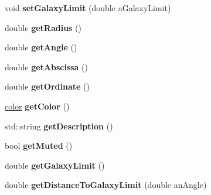 \begin{DoxyCompactItemize}
\item 
\hypertarget{class_star_a3b8c8edca0eb3ccc89a4b91227bc7d97}{void {\bfseries set\-Galaxy\-Limit} (double a\-Galaxy\-Limit)}\label{class_star_a3b8c8edca0eb3ccc89a4b91227bc7d97}

\item 
\hypertarget{class_star_a8791cc2c8764f7213379dccc47cb6327}{double {\bfseries get\-Radius} ()}\label{class_star_a8791cc2c8764f7213379dccc47cb6327}

\item 
\hypertarget{class_star_a8ccf772d6c9cbfae316d5826cbd9a005}{double {\bfseries get\-Angle} ()}\label{class_star_a8ccf772d6c9cbfae316d5826cbd9a005}

\item 
\hypertarget{class_star_a15a3dc0db429e55c800c5b223188d621}{double {\bfseries get\-Abscissa} ()}\label{class_star_a15a3dc0db429e55c800c5b223188d621}

\item 
\hypertarget{class_star_aeff266b94f5f11a0284936c7463504cc}{double {\bfseries get\-Ordinate} ()}\label{class_star_aeff266b94f5f11a0284936c7463504cc}

\item 
\hypertarget{class_star_ab3b191c54d8d42677845d2e5216bc3dd}{\hyperlink{structcolor}{color} {\bfseries get\-Color} ()}\label{class_star_ab3b191c54d8d42677845d2e5216bc3dd}

\item 
\hypertarget{class_star_aa87c110acd935d65ab862d0bd3ee662a}{std\-::string {\bfseries get\-Description} ()}\label{class_star_aa87c110acd935d65ab862d0bd3ee662a}

\item 
\hypertarget{class_star_a89b13cf4eabb12f59ba0e4286b351d9a}{bool {\bfseries get\-Muted} ()}\label{class_star_a89b13cf4eabb12f59ba0e4286b351d9a}

\item 
\hypertarget{class_star_acd0708d8166d6dba1edd61cab35f80bc}{double {\bfseries get\-Galaxy\-Limit} ()}\label{class_star_acd0708d8166d6dba1edd61cab35f80bc}

\item 
\hypertarget{class_star_a34d3229ef6683f7eb62ccbf22816f3c4}{double {\bfseries get\-Distance\-To\-Galaxy\-Limit} (double an\-Angle)}\label{class_star_a34d3229ef6683f7eb62ccbf22816f3c4}

\end{DoxyCompactItemize}
